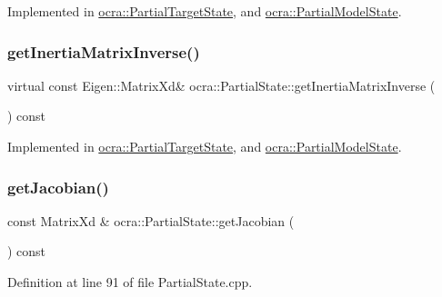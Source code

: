 Implemented in \hyperlink{classocra_1_1PartialTargetState_a757cd49fca47e934025e92b81dc15535}{ocra\+::\+Partial\+Target\+State}, and \hyperlink{classocra_1_1PartialModelState_a9fe03ab8c3c4afe56ee4b59f96ac4a25}{ocra\+::\+Partial\+Model\+State}.

\hypertarget{classocra_1_1PartialState_a83979e39dd3631861c724514e49cb8b4}{}\label{classocra_1_1PartialState_a83979e39dd3631861c724514e49cb8b4} 
\subsubsection{\texorpdfstring{get\+Inertia\+Matrix\+Inverse()}{getInertiaMatrixInverse()}}
{\footnotesize\ttfamily virtual const Eigen\+::\+Matrix\+Xd\& ocra\+::\+Partial\+State\+::get\+Inertia\+Matrix\+Inverse (\begin{DoxyParamCaption}{ }\end{DoxyParamCaption}) const\hspace{0.3cm}{\ttfamily [pure virtual]}}



Implemented in \hyperlink{classocra_1_1PartialTargetState_a0e6f90f112e0a54384eb99dd7def49e0}{ocra\+::\+Partial\+Target\+State}, and \hyperlink{classocra_1_1PartialModelState_a664e4f70861eefde844dca6dd09a2213}{ocra\+::\+Partial\+Model\+State}.

\hypertarget{classocra_1_1PartialState_a563b7fb82df68c847120211884019e17}{}\label{classocra_1_1PartialState_a563b7fb82df68c847120211884019e17} 
\subsubsection{\texorpdfstring{get\+Jacobian()}{getJacobian()}}
{\footnotesize\ttfamily const Matrix\+Xd \& ocra\+::\+Partial\+State\+::get\+Jacobian (\begin{DoxyParamCaption}{ }\end{DoxyParamCaption}) const}



Definition at line 91 of file Partial\+State.\+cpp.

\hypertarget{classocra_1_1PartialState_a2de65bbf0d2bb85a98d444c3f3bf0b06}{}\label{classocra_1_1PartialState_a2de65bbf0d2bb85a98d444c3f3bf0b06} 
